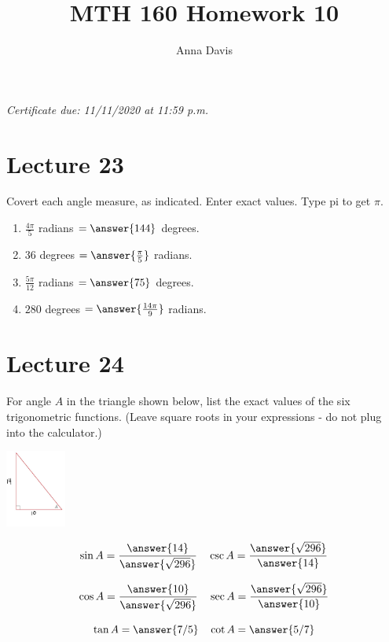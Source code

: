 \documentclass{ximera}
\author{Anna Davis} \title{MTH 160 Homework 10}
\begin{document}
\begin{abstract}

\end{abstract}
\maketitle
 \textit{Certificate due: 11/11/2020 at 11:59 p.m.}
 \section{Lecture 23}
\begin{problem}\label{prob:160hom10prob1}
Covert each angle measure, as indicated.  Enter exact values.  Type pi to get $\pi$.
\begin{enumerate}
    \item $\frac{4\pi}{5}$ radians $=\answer{144}$ degrees.
    \item $36$ degrees $=\answer{\frac{\pi}{5}}$ radians.
    \item $\frac{5\pi}{12}$ radians $=\answer{75}$ degrees.
    \item $280$ degrees $=\answer{\frac{14\pi}{9}}$ radians.
\end{enumerate}
\end{problem}

\section{Lecture 24}

\begin{problem}\label{prob:160hom10prob2}
For angle $A$ in the triangle shown below, list the exact values of the six trigonometric functions. (Leave square roots in your expressions - do not plug into the calculator.)
\begin{image}
   
\includegraphics[height=1in]{160H10pic5.jpg}~
 
\end{image}

$$\sin A=\frac{\answer{14}}{\answer{\sqrt{296}}}\quad \csc A=\frac{\answer{\sqrt{296}}}{\answer{14}}$$

$$\cos A=\frac{\answer{10}}{\answer{\sqrt{296}}}\quad \sec A=\frac{\answer{\sqrt{296}}}{\answer{10}}$$

$$\tan A=\answer{7/5}\quad \cot A=\answer{5/7}$$
\end{problem}
\end{document}
